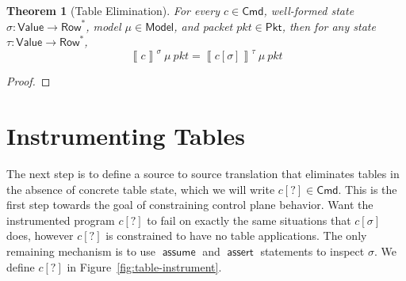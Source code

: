 \documentclass{article}
\newcommand{\pkt}{\mathit{pkt}}
\newcommand{\denote}[1]{\left\llbracket#1\right\rrbracket}
\newcommand{\Value}{\mathsf{Value}}
\newcommand{\Cmd}{\mathsf{Cmd}}
\newcommand{\Pkt}{\mathsf{Pkt}}
\newcommand{\Model}{\mathsf{Model}}
\newcommand{\Row}{\mathsf{Row}}
\newcommand{\assert}{\mathop{\mathsf{assert}}}
\newcommand{\assume}{\mathop{\mathsf{assume}}}
\newtheorem{theorem}{Theorem}
\begin{document}
\begin{theorem}[Table Elimination]
  For every $c \in \Cmd$, well-formed state $\sigma : \Value \to \Row^*$, model
  $\mu \in \Model$, and packet $\pkt \in \Pkt$, then for any state $\tau :
  \Value \to \Row^*$,
  \[\denote{c}^\sigma~\mu~\pkt = \denote{c[\sigma]}^\tau~\mu~\pkt\]
\end{theorem}
\begin{proof}
\end{proof}

\section{Instrumenting Tables}

The next step is to define a source to source translation that eliminates tables
in the absence of concrete table state, which we will write $c[?] \in \Cmd$.
This is the first step towards the goal of constraining control plane behavior.
Want the instrumented program $c[?]$ to fail on exactly the same situations that
$c[\sigma]$ does, however $c[?]$ is constrained to have no table applications.
The only remaining mechanism is to use $\assume$ and $\assert$ statements to
inspect $\sigma$. We define $c[?]$ in Figure~\ref{fig:table-instrument}.
\end{document}
